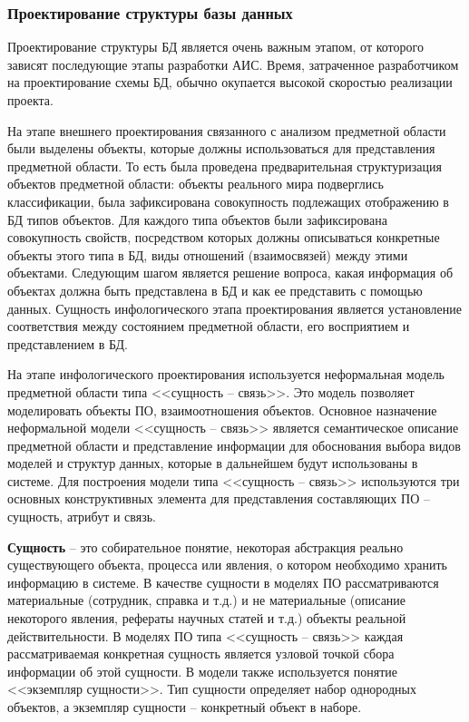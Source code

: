 \subsubsection{Проектирование структуры базы данных} \hfill

Проектирование структуры БД является очень важным этапом, от которого зависят последующие этапы разработки АИС. Время, затраченное разработчиком на проектирование схемы БД, обычно окупается высокой скоростью реализации проекта.

На этапе внешнего проектирования связанного с анализом предметной области были выделены объекты, которые должны использоваться для представления предметной области. То есть была проведена предварительная структуризация объектов предметной области: объекты реального мира подверглись классификации, была зафиксирована совокупность подлежащих отображению в БД типов объектов. Для каждого типа объектов были зафиксирована совокупность свойств, посредством которых должны описываться конкретные объекты этого типа в БД, виды отношений (взаимосвязей) между этими объектами. Следующим шагом является решение вопроса, какая информация об объектах должна быть представлена в БД и как ее представить с помощью данных. Сущность инфологического этапа проектирования является установление соответствия между состоянием предметной области, его восприятием и представлением в БД.

На этапе инфологического проектирования используется неформальная модель предметной области типа <<сущность -- связь>>. Это модель позволяет моделировать объекты ПО, взаимоотношения объектов. Основное назначение неформальной модели <<сущность -- связь>> является семантическое описание предметной области и представление информации для обоснования выбора видов моделей и структур данных, которые в дальнейшем будут использованы в системе. Для построения модели типа <<сущность -- связь>> используются три основных конструктивных элемента для представления составляющих ПО – сущность, атрибут и связь.

\textbf{Сущность} -- это собирательное понятие, некоторая абстракция реально существующего объекта, процесса или явления, о котором необходимо хранить информацию в системе. В качестве сущности в моделях ПО рассматриваются материальные (сотрудник, справка и т.д.) и не материальные (описание некоторого явления, рефераты научных статей и т.д.) объекты реальной действительности. В моделях ПО типа <<сущность -- связь>> каждая рассматриваемая конкретная сущность является узловой точкой сбора информации об этой сущности. В модели также используется понятие <<экземпляр сущности>>. Тип сущности определяет набор однородных объектов, а экземпляр сущности -- конкретный объект в наборе.

